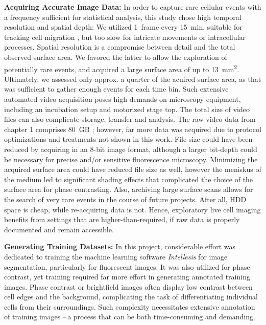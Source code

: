 \textbf{Acquiring Accurate Image Data:}
In order to capture rare cellular events with a frequency sufficient for
statistical analysis, this study chose high temporal resolution and spatial
depth: We utilized \SI{1}{frame} every \SI{15}{\minute}, suitable for tracking
cell migration \cite{huthSignificantlyImprovedPrecision2010}, but too slow for
intricate movements or intracellular processes. Spatial resolution is a
compromise between detail and the total observed surface area. We favored the
latter to allow the exploration of potentially rare events, and acquired a
 large surface area of up to
\SI{13}{\milli\meter\squared}. Ultimately, we assessed only approx. a quarter of
the acuired surface area, as that was sufficient to gather enough events for
each time bin. Such extensive automated video acquisition poses high demands on
microscopy equipment, including an incubation setup and motorized stage top. The
total size of video files can also complicate storage, transfer and analysis.
The raw video data from chapter 1 comprises \SI{80}{GB}
\cite{biostudiesBioStudiesEuropeanBioinformatics}; however, far more data was
acquired due to protocol optimizations and treatments not shown in this work.
File size could have been reduced by acquiring in an 8-bit image format,
although a larger bit-depth could be necessary for precise and/or sensitive
fluorescence microscopy. Minimizing the acquired surface area could have reduced
file size as well, however the meniskus of the medium led to significant shading
effects that complicated the choice of the surface area for phase contrasting.
Also, archiving large surface scans allows for the search of very rare events in
the course of future projects. After all, HDD space is cheap, while re-acquiring
data is not. Hence, exploratory live cell imaging benefits from settings that
are higher-than-required, if raw data is properly documented and remain
accessible.



\textbf{Generating Training Datasets:}
In this project, considerable effort was dedicated to training the machine
learning software \textit{Intellesis} for image segmentation, particularly for
fluorescent images. It was also utilized for phase contrast, yet training
required far more effort in generating annotated training images. Phase contrast
or brightfield images often display low contrast between cell edges and the
background, complicating the task of differentiating individual cells from their
surroundings. Such complexity necessitates extensive annotation of training
images --\,a process that can be both time-consuming and demanding.

